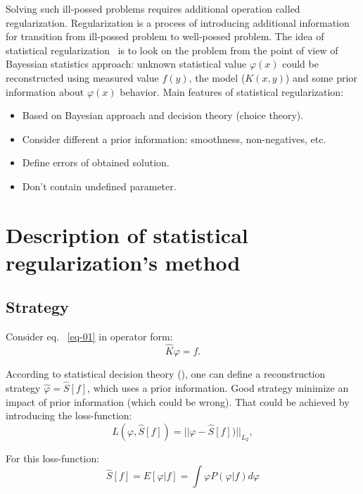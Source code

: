 \documentclass{webofc}
\begin{document}
Solving such ill-possed problems requires additional operation called regularization. Regularization is a process of introducing additional information for transition from ill-possed problem to well-possed problem. The idea of statistical regularization~\cite{Turchin, Turovceva} is to look on the problem from the point of view of Bayessian statistics approach: unknown statistical value $\varphi(x)$ could be reconstructed using  measured value $f(y)$, the model ($K(x,y)$) and some prior information about $\varphi(x)$ behavior. Main features of statistical regularization:
\begin{itemize}
    \item Based on Bayesian approach and decision theory (choice theory).
    \item Consider different a prior information: smoothness, non-negatives, etc.
    \item Define errors of obtained solution.
    \item Don't contain undefined parameter.
\end{itemize}

\section{Description of statistical regularization's method}

\subsection{Strategy}\label{sec:theory:strat}

Consider eq. ~\ref{eq-01} in operator form:
\begin{equation}
	\label{eq-02}
    \hat{K}\varphi = f.
\end{equation}

According to statistical decision theory (\cite{james2006statistical}), one can define a reconstruction strategy  $\hat{\varphi} = \hat{S}[f]$, which uses a prior information. Good strategy minimize an impact of prior information (which could be wrong). That could be achieved by introducing the loss-function:
\begin{equation*}
	L(\varphi,\hat{S}[f]) = ||\varphi-\hat{S}[f])||_{L_2},
\end{equation*}

For this loss-function:
\begin{equation}
	\label{eq:opt}
	\hat{S}[f] = E[\varphi|f] = \int \varphi P(\varphi|f)d\varphi
\end{equation}
\end{document}
